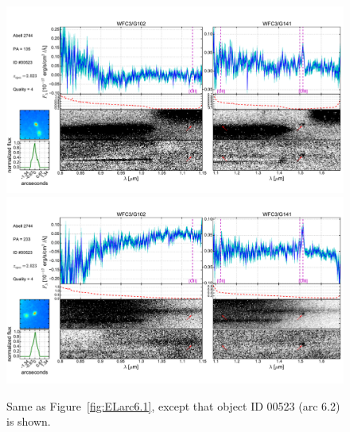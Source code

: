 \begin{figure}
    \centering
    \includegraphics[width=\textwidth]{fig/clA2744_id523_pa135_zsQ4.pdf}\\
    \includegraphics[width=\textwidth]{fig/clA2744_id523_pa233_zsQ4.pdf}
    \caption{Same as Figure~\ref{fig:ELarc6.1}, except that object ID 00523 (arc 6.2) is shown.}
    \label{fig:ELarc6.2}
\end{figure}

